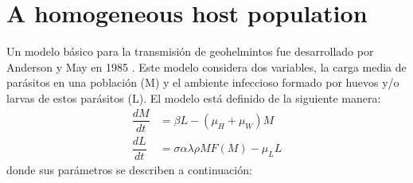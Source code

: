 \documentclass[12pt,a4paper]{article}
\theoremstyle{plain}%
\theoremstyle{definition}
\theoremstyle{remark}
\begin{document}
	\section{A homogeneous host population}
	Un modelo básico para la transmisión de geohelmintos fue desarrollado por Anderson y May en 1985 \citep{anderson1992infectious}. 
	Este modelo considera dos variables, la carga media de parásitos en una población (M) y 
	el ambiente infeccioso formado por huevos y/o larvas de estos parásitos (L).
	El modelo está definido de la siguiente manera:   
	\begin{equation}\label{model1}
	\begin{split}
	\dfrac{dM}{dt}&=\beta L - (\mu_H+\mu_W) M\\
	\dfrac{dL}{dt}&=\sigma \alpha \lambda  \rho M F(M)  - \mu_L L 
	\end{split}
	\end{equation}
	donde sus parámetros se describen a continuación:
\end{document}
